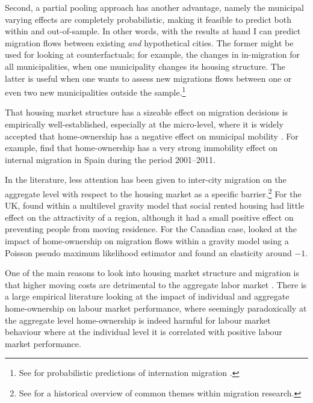 \documentclass[fleqn,10pt]{SelfArx} %
\begin{document}
Second, a partial pooling approach has another advantage, namely the municipal
varying effects are completely probabilistic, making it feasible to predict both
within and out-of-sample. In other words, with the results at hand I can predict
migration flows between existing \emph{and} hypothetical cities. The former
might be used for looking at counterfactuals; for example, the changes in
in-migration for all municipalities, when one municipality changes its housing
structure. The latter is useful when one wants to assess new migrations flows
between one or even two new municipalities outside the sample.\footnote{See for
  probabilistic predictions of internation migration \cite{azose2015bayesian}.}

That housing market structure has a sizeable effect on migration decisions is
empirically well-established, especially at the micro-level, where it is widely
accepted that home-ownership has a negative effect on municipal mobility
\citep{dietz2003social, dohmen2005housing}. For example,
\citet{palomares2018understanding} find that home-ownership has a very strong
immobility effect on internal migration in Spain during the period 2001--2011.

In the literature, less attention has been given to inter-city migration on the
aggregate level with respect to the housing market as a specific
barrier.\footnote{See \citet{cushing2004crossing} for a historical overview of
  common themes within migration research.} For the UK,
\citet{congdon2010random} found within a multilevel gravity model that social
rented housing had little effect on the attractivity of a region, although it
had a small positive effect on preventing people from moving residence. For the
Canadian case, \citet{amirault2016drags} looked at the impact of home-ownership
on migration flows within a gravity model using a Poisson pseudo maximum
likelihood estimator and found an elasticity around $-1$.

One of the main reasons to look into housing market structure and migration is
that higher moving costs are detrimental to the aggregate labor market
\citep{oswald1996conjecture, oswald1999housing}. There is a large empirical
literature \citep[see, e.g., ][]{munch2006homeowners, munch2008home,
  de2013european} looking at the impact of individual and aggregate
home-ownership on labour market performance, where seemingly paradoxically at
the aggregate level home-ownership is indeed harmful for labour market behaviour
where at the individual level it is correlated with positive labour market
performance.
\end{document}
